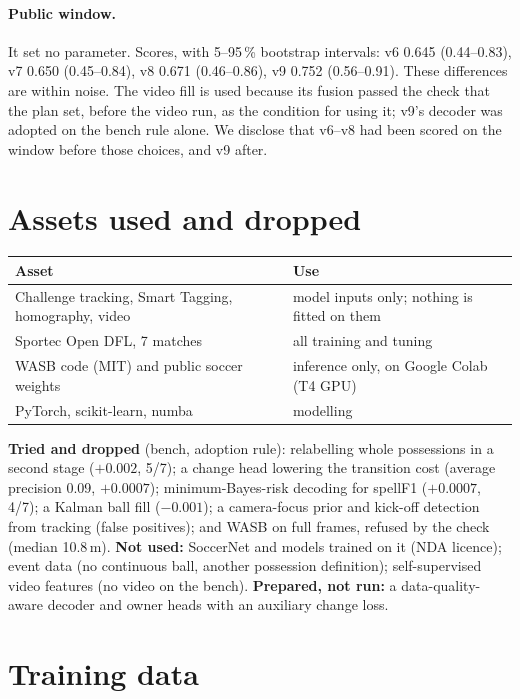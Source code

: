 \documentclass[11pt,a4paper]{article}
\begin{document}
\paragraph{Public window.} It set no parameter. Scores, with 5--95\,\% bootstrap intervals: v6 0.645
(0.44--0.83), v7 0.650 (0.45--0.84), v8 0.671 (0.46--0.86), v9 0.752 (0.56--0.91). These differences
are within noise. The video fill is used because its fusion passed the check that the plan set,
before the video run, as the condition for using it; v9's decoder was adopted on the bench rule
alone. We disclose that v6--v8 had been scored on the window before those choices, and v9 after.

\section{Assets used and dropped}

\begin{table}[h]
  \centering\small
  \begin{tabularx}{\textwidth}{lX}
    \toprule
    Asset & Use \\
    \midrule
    Challenge tracking, Smart Tagging, homography, video & model inputs only; nothing is fitted on them \\
    Sportec Open DFL, 7 matches~\cite{dfl} & all training and tuning \\
    WASB code (MIT) and public soccer weights~\cite{wasb} & inference only, on Google Colab (T4 GPU) \\
    PyTorch, scikit-learn, numba & modelling \\
    \bottomrule
  \end{tabularx}
\end{table}

\noindent\textbf{Tried and dropped} (bench, adoption rule): relabelling whole possessions in a second
stage ($+0.002$, 5/7); a change head lowering the transition cost (average precision 0.09, $+0.0007$);
minimum-Bayes-risk decoding for spellF1 ($+0.0007$, 4/7); a Kalman ball fill ($-0.001$); a
camera-focus prior and kick-off detection from tracking (false positives); and WASB on full frames,
refused by the check (median 10.8\,m). \textbf{Not used:} SoccerNet and models trained on it (NDA
licence); event data (no continuous ball, another possession definition); self-supervised video
features (no video on the bench). \textbf{Prepared, not run:} a data-quality-aware decoder and owner
heads with an auxiliary change loss.

\section{Training data}
\label{sec:data}
\end{document}
